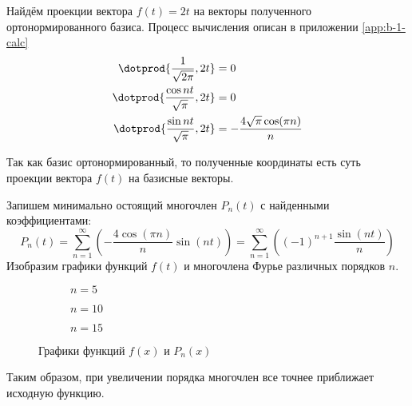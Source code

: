 Найдём проекции вектора \(f(t) = 2t\) на векторы полученного
ортонормированного базиса.
Процесс вычисления описан в приложении \ref{app:b-1-calc}
\begin{align*}
  \dotprod{\frac{1}{\sqrt{2\pi}}, 2t} &= 0 \\
  \dotprod{\frac{\cos nt}{\sqrt{\pi}}, 2t} &= 0 \\
  \dotprod{\frac{\sin nt}{\sqrt{\pi}}, 2t}
    &= -\frac{4 \sqrt{\pi} \cos(\pi n)}{n}
\end{align*}

Так как базис ортонормированный,
то полученные координаты есть суть проекции
вектора \(f(t)\) на базисные векторы.

Запишем минимально остоящий многочлен \(P_{n}(t)\)
с найденными коэффициентами:
\[
  P_{n}(t)
  = \sum_{n = 1}^{\infty}
    \left(-\frac{4\cos(\pi n)}{n} \sin(nt)\right)
  = \sum_{n = 1}^{\infty}
    \left({(-1)}^{n + 1} \frac{\sin(nt)}{n}\right)
\]
Изобразим графики функций \(f(t)\) и многочлена Фурье
различных порядков \(n\).

\begin{figure}[!htbp]
  \centering
  \begin{subfigure}{0.32\textwidth}
    \centering
    \caption{\(n = 5\)}
  \end{subfigure}
  \begin{subfigure}{0.32\textwidth}
    \centering
    \caption{\(n = 10\)}
  \end{subfigure}
  \begin{subfigure}{0.32\textwidth}
    \centering
    \caption{\(n = 15\)}
  \end{subfigure}
  \caption{Графики функций \(f(x)\) и \(P_{n}(x)\)}
\end{figure}

Таким образом,
при увеличении порядка многочлен все точнее приближает исходную функцию.
